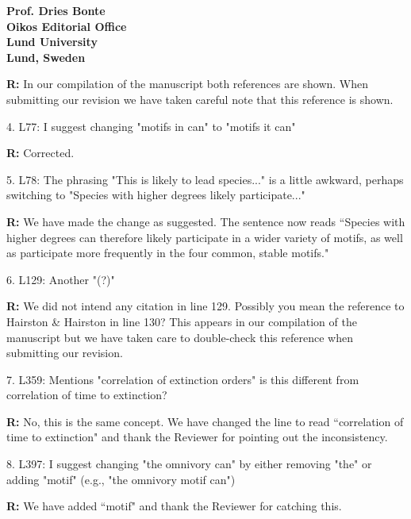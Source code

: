 \documentclass[12pt]{letter}
\begin{document}
\begin{letter}{\bf Prof. Dries Bonte\\
Oikos Editorial Office \\
Lund University \\
Lund, Sweden}
    \smallskip

    \textbf{R:} In our compilation of the manuscript both references are shown. When submitting our revision we have taken careful note that this reference is shown.

    \smallskip

    4. L77: I suggest changing "motifs in can" to "motifs it can"

    \smallskip

    \textbf{R:} Corrected.

    \smallskip

    5. L78: The phrasing "This is likely to lead species..." is a little awkward, perhaps switching to "Species with higher degrees likely participate..."

    \smallskip

    \textbf{R:} We have made the change as suggested. The sentence now reads ``Species with higher degrees can therefore likely participate in a wider variety of motifs, as well as participate more frequently in the four common, stable motifs."

    \smallskip

    6. L129: Another "(?)"

    \smallskip

    \textbf{R:} We did not intend any citation in line 129. Possibly you mean the reference to Hairston \& Hairston in line 130? This appears in our compilation of the manuscript but we have taken care to double-check this reference when submitting our revision.%

    \smallskip

    7. L359: Mentions "correlation of extinction orders" is this different from correlation of time to extinction?

    \smallskip

    \textbf{R:} No, this is the same concept. We have changed the line to read ``correlation of time to extinction" and thank the Reviewer for pointing out the inconsistency.

    \smallskip

    8. L397: I suggest changing "the omnivory can" by either removing "the" or adding "motif" (e.g., "the omnivory motif can")

    \smallskip

    \textbf{R:} We have added ``motif" and thank the Reviewer for catching this.

    \smallskip


\end{letter}
\end{document}
